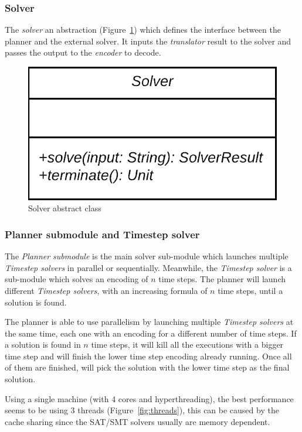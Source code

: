 \documentclass{report}
\theoremstyle{plain}
\begin{document}
\subsubsection{Solver}
The \emph{solver} an abstraction (Figure~\ref{fig:solver-interface}) which defines the interface between the planner and the external solver. It inputs the \emph{translator} result to the solver and passes the output to the \emph{encoder} to decode. 

\begin{figure}
    \centering
    \includegraphics[scale=0.25]{solver-interface.png}
    \caption{Solver abstract class}
    \label{fig:solver-interface}
\end{figure}

\subsubsection{Planner submodule and Timestep solver}
The \emph{Planner submodule} is the main solver sub-module which launches multiple \emph{Timestep solvers} in parallel or sequentially. Meanwhile, the \emph{Timestep solver} is a sub-module which solves an encoding of $n$ time steps. The planner will launch different \emph{Timestep solvers}, with an increasing formula of $n$ time steps, until a solution is found.

The planner is able to use parallelism by launching multiple \emph{Timestep solvers} at the same time, each one with an encoding for a different number of time steps. If a solution is found in $n$ time steps, it will kill all the executions with a bigger time step and will finish the lower time step encoding already running. Once all of them are finished, will pick the solution with the lower time step as the final solution.

Using a single machine (with 4 cores and hyperthreading), the best performance seems to be using 3 threads (Figure~\ref{fig:threads}), this can be caused by the cache sharing since the SAT/SMT solvers usually are memory dependent.
\end{document}
